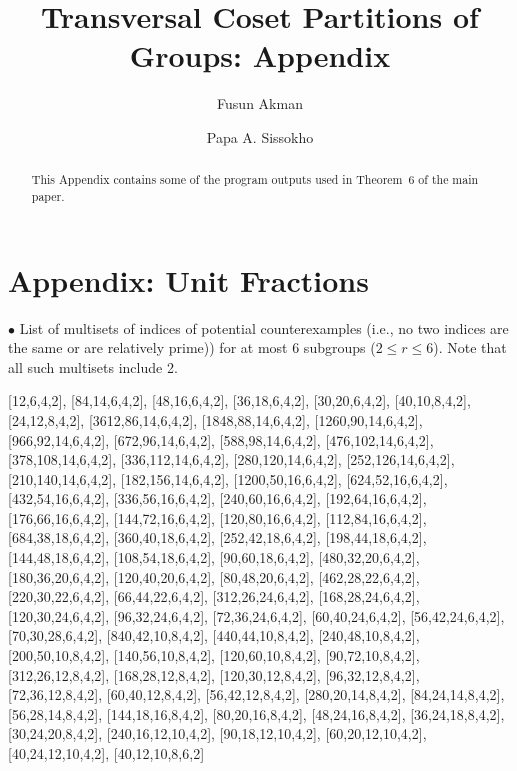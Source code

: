 \documentclass[12pt]{amsart}
\def \n{\noindent }
\def \bs{\bigskip}
\begin{document}
 



\title[Transversal Coset Partitions of Groups]{Transversal Coset Partitions of Groups: Appendix}
\author{Fusun Akman}
\address[Fusun Akman and Papa A. Sissokho]{Mathematics Department, Illinois State University, Normal, Illinois 61790, USA}
\author{Papa A. Sissokho}

\begin{abstract} This Appendix contains some of the program outputs used in Theorem~$6$ of the main paper.
\end{abstract}
\maketitle

\section{Appendix: Unit Fractions}\label{app}


\n $\bullet$ List of multisets of indices of potential counterexamples (i.e.,  no two indices are the same or are relatively prime)) for at most 6 subgroups ($2\leq r\leq 6$). Note
that all such multisets include 2.

\bs

[12,6,4,2],   [84,14,6,4,2],   [48,16,6,4,2],   [36,18,6,4,2],   [30,20,6,4,2],   [40,10,8,4,2],   [24,12,8,4,2],   [3612,86,14,6,4,2],   [1848,88,14,6,4,2],
[1260,90,14,6,4,2],   [966,92,14,6,4,2],   [672,96,14,6,4,2],   [588,98,14,6,4,2],   [476,102,14,6,4,2],   [378,108,14,6,4,2],   [336,112,14,6,4,2],   [280,120,14,6,4,2],
[252,126,14,6,4,2],   [210,140,14,6,4,2],   [182,156,14,6,4,2],   [1200,50,16,6,4,2],   [624,52,16,6,4,2],   [432,54,16,6,4,2],   [336,56,16,6,4,2],   [240,60,16,6,4,2],
[192,64,16,6,4,2],   [176,66,16,6,4,2],   [144,72,16,6,4,2],   [120,80,16,6,4,2],   [112,84,16,6,4,2],   [684,38,18,6,4,2],   [360,40,18,6,4,2],   [252,42,18,6,4,2],
[198,44,18,6,4,2],   [144,48,18,6,4,2],   [108,54,18,6,4,2],   [90,60,18,6,4,2],   [480,32,20,6,4,2],   [180,36,20,6,4,2],   [120,40,20,6,4,2],   [80,48,20,6,4,2],
[462,28,22,6,4,2],   [220,30,22,6,4,2],   [66,44,22,6,4,2],   [312,26,24,6,4,2],   [168,28,24,6,4,2],   [120,30,24,6,4,2],   [96,32,24,6,4,2],   [72,36,24,6,4,2],
[60,40,24,6,4,2],   [56,42,24,6,4,2],   [70,30,28,6,4,2],   [840,42,10,8,4,2],   [440,44,10,8,4,2],   [240,48,10,8,4,2],   [200,50,10,8,4,2],   [140,56,10,8,4,2],
[120,60,10,8,4,2],   [90,72,10,8,4,2],   [312,26,12,8,4,2],   [168,28,12,8,4,2],   [120,30,12,8,4,2],   [96,32,12,8,4,2],   [72,36,12,8,4,2],   [60,40,12,8,4,2],
[56,42,12,8,4,2],   [280,20,14,8,4,2],   [84,24,14,8,4,2],   [56,28,14,8,4,2],   [144,18,16,8,4,2],   [80,20,16,8,4,2],   [48,24,16,8,4,2],   [36,24,18,8,4,2],
[30,24,20,8,4,2],   [240,16,12,10,4,2],   [90,18,12,10,4,2],   [60,20,12,10,4,2],   [40,24,12,10,4,2],   [40,12,10,8,6,2]
\end{document}
